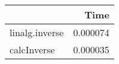\begin{tabular}{lr}
\toprule
{} &      Time \\
\midrule
linalg.inverse &  0.000074 \\
calcInverse    &  0.000035 \\
\bottomrule
\end{tabular}
